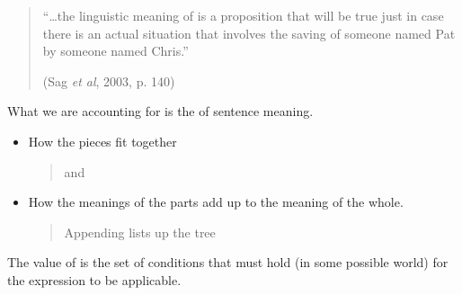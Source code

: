 \documentclass[a4paper,landscape,headrule,footrule]{foils}
\begin{document}

\begin{quote}
  “\ldots the linguistic meaning of  is a proposition
  that will be true just in case there is an actual situation that
  involves the saving of someone named Pat by someone named Chris.”
  \begin{flushright}
    (Sag \textit{et al}, 2003, p. 140)
  \end{flushright}
\end{quote}


What we are accounting for is the  of
sentence meaning.

\begin{itemize}
\item How the pieces fit together
  \begin{quote}
     and     
  \end{quote}
\item How the meanings of the parts add up to the meaning
of the whole.
\begin{quote}
  Appending  lists up the tree  
\end{quote}
\end{itemize}

The value of  is the set of conditions that must
hold (in some possible world) for the expression to be applicable.
\end{document}
